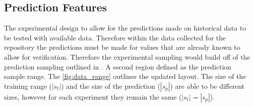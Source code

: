 \subsection{Prediction Features}










The experimental design to allow for the predictions made on historical data to be tested with available data. Therefore within the data collected for the repository the predictions must be made for values that are already known to allow for verification. Therefore the experimental sampling would build off of the prediction sampling outlined in . A second region defined as the prediction sample range. The \autoref{fig:data_range} outlines the updated layout. The size of the training range ($|s_t|$) and the size of the prediction ($|s_p|$) are able to be different sizes, however for each experiment they remain the same ($|s_t| = |s_p|$).


